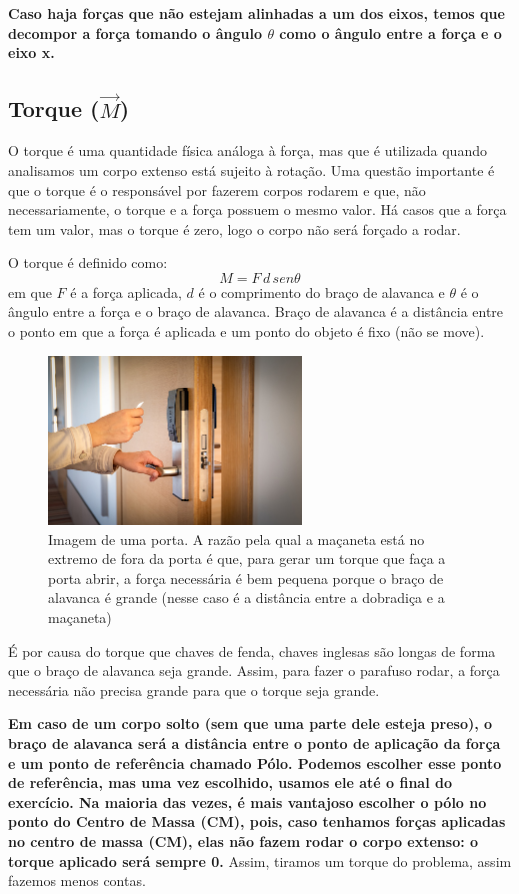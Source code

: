\documentclass[12pt]{extarticle}
\newcommand{\<}{\langle}
\renewcommand{\>}{\rangle}
\theoremstyle{definition}
\begin{document}
\textbf{Caso haja forças que não estejam alinhadas a um dos eixos, temos que decompor a força tomando o ângulo $\theta$ como o ângulo entre a força e o eixo x.}

\subsection{Torque ($\vec{M}$)}
O torque é uma quantidade física análoga à força, mas que é utilizada quando analisamos um corpo extenso está sujeito à rotação. Uma questão importante é que o torque é o responsável por fazerem corpos rodarem e que, não necessariamente, o torque e a força possuem o mesmo valor. Há casos que a força tem um valor, mas o torque é zero, logo o corpo não será forçado a rodar.

O torque é definido como:
\begin{equation}
    M = F\,d\, sen \theta
\end{equation}
\noindent em que $F$ é a força aplicada, $d$ é o comprimento do braço de alavanca e $\theta$ é o ângulo entre a força e o braço de alavanca. Braço de alavanca é a distância entre o ponto em que a força é aplicada e um ponto do objeto é fixo (não se move).

\begin{figure}[H]
    \centering
    \includegraphics[width=0.6\textwidth]{porta.jpg}
    \caption{Imagem de uma porta. A razão pela qual a maçaneta está no extremo de fora da porta é que, para gerar um torque que faça a porta abrir, a força necessária é bem pequena porque o braço de alavanca é grande (nesse caso é a distância entre a dobradiça e a maçaneta)}
    \label{fig:porta}
\end{figure}

É por causa do torque que chaves de fenda, chaves inglesas são longas de forma que o braço de alavanca seja grande. Assim, para fazer o parafuso rodar, a força necessária não precisa grande para que o torque seja grande.

\textbf{Em caso de um corpo solto (sem que uma parte dele esteja preso), o braço de alavanca será a distância entre o ponto de aplicação da força e um ponto de referência chamado Pólo. Podemos escolher esse ponto de referência, mas uma vez escolhido, usamos ele até o final do exercício. Na maioria das vezes, é mais vantajoso escolher o pólo no ponto do Centro de Massa (CM), pois, caso tenhamos forças aplicadas no centro de massa (CM), elas não fazem rodar o corpo extenso: o torque aplicado será sempre 0.}
Assim, tiramos um torque do problema, assim fazemos menos contas.
\end{document}
